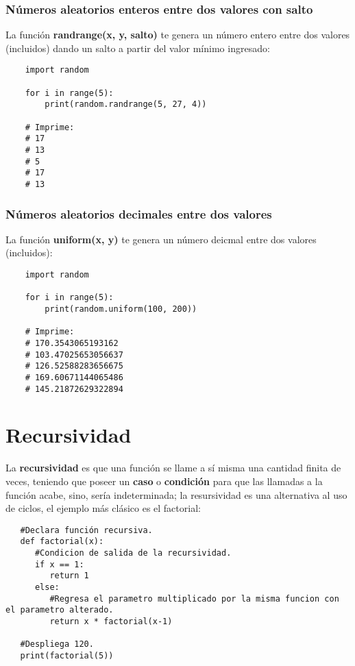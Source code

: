 \subsubsection{Números aleatorios enteros entre dos valores con salto}
\hspace{0.55cm}La función \textbf{randrange(x, y, salto)} te genera un número entero entre dos valores (incluidos) dando un salto a partir del valor mínimo ingresado:
\begin{lstlisting}
	import random

	for i in range(5):
		print(random.randrange(5, 27, 4))

	# Imprime:
	# 17
	# 13
	# 5
	# 17
	# 13
\end{lstlisting}


\subsubsection{Números aleatorios decimales entre dos valores}
\hspace{0.55cm}La función \textbf{uniform(x, y)} te genera un número deicmal entre dos valores (incluidos):
\begin{lstlisting}
	import random

	for i in range(5):
		print(random.uniform(100, 200))

	# Imprime:
	# 170.3543065193162
	# 103.47025653056637
	# 126.52588283656675
	# 169.60671144065486
	# 145.21872629322894
\end{lstlisting}



\section{Recursividad}
\hspace{0.55cm}La \textbf{recursividad} es que una función se llame a sí misma una cantidad finita de veces, teniendo que poseer un \textbf{caso} o \textbf{condición} para que las llamadas a la función acabe, sino, sería indeterminada; la resursividad es una alternativa al uso de ciclos, el ejemplo más clásico es el factorial:
\begin{lstlisting}
   #Declara función recursiva.
   def factorial(x):
      #Condicion de salida de la recursividad.
      if x == 1:
         return 1
      else:
         #Regresa el parametro multiplicado por la misma funcion con el parametro alterado.
         return x * factorial(x-1)

   #Despliega 120.
   print(factorial(5))
\end{lstlisting}

